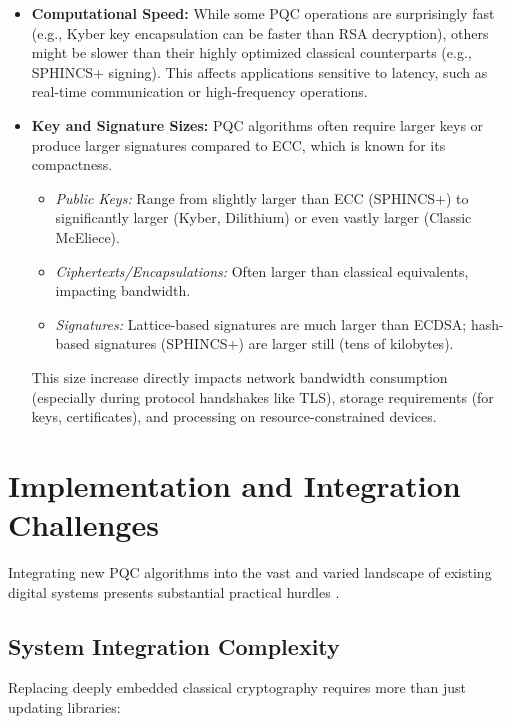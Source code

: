 \begin{itemize}
    \item \textbf{Computational Speed:} While some PQC operations are surprisingly fast (e.g., Kyber key encapsulation can be faster than RSA decryption), others might be slower than their highly optimized classical counterparts (e.g., SPHINCS+ signing). This affects applications sensitive to latency, such as real-time communication or high-frequency operations.

    \newpage

    \item \textbf{Key and Signature Sizes:} PQC algorithms often require larger keys or produce larger signatures compared to ECC, which is known for its compactness.
        \begin{itemize}
            \item \textit{Public Keys:} Range from slightly larger than ECC (SPHINCS+) to significantly larger (Kyber, Dilithium) or even vastly larger (Classic McEliece).
            \item \textit{Ciphertexts/Encapsulations:} Often larger than classical equivalents, impacting bandwidth.
            \item \textit{Signatures:} Lattice-based signatures are much larger than ECDSA; hash-based signatures (SPHINCS+) are larger still (tens of kilobytes).
        \end{itemize}
        This size increase directly impacts network bandwidth consumption (especially during protocol handshakes like TLS), storage requirements (for keys, certificates), and processing on resource-constrained devices.
\end{itemize}

\section{Implementation and Integration Challenges}\label{sec:implementation_ch7_rev}
Integrating new PQC algorithms into the vast and varied landscape of existing digital systems presents substantial practical hurdles \parencite{pqc_deployment_cases_2024}.

\subsection{System Integration Complexity}\label{subsec:integration_ch7_rev}
Replacing deeply embedded classical cryptography requires more than just updating libraries:

